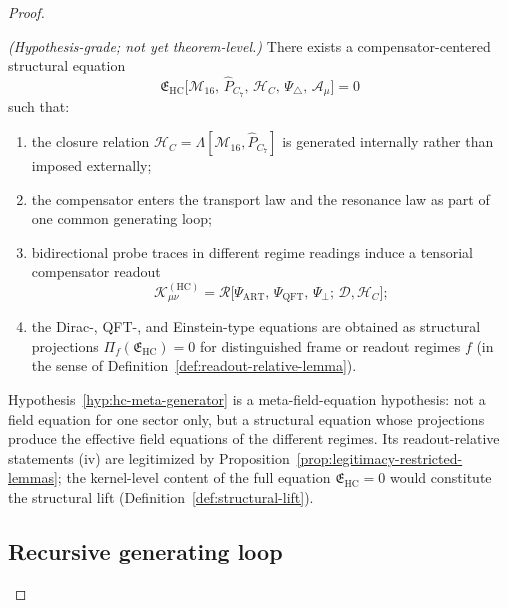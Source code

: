 \begin{proof}
\begin{proposition}
\label{hyp:hc-meta-generator}
\emph{(Hypothesis-grade; not yet theorem-level.)}
There exists a compensator-centered structural equation
\[
  \mathfrak{E}_{\mathrm{HC}}
  \bigl[
    \mathcal{M}_{16},\,
    \hat{P}_{C_7},\,
    \mathcal{H}_C,\,
    \Psi_\triangle,\,
    \mathcal{A}_\mu
  \bigr]
  = 0
\]
such that:
\begin{enumerate}[label=(\roman*)]
  \item the closure relation
        $\mathcal{H}_C = \Lambda[\mathcal{M}_{16},\hat{P}_{C_7}]$
        is generated internally rather than imposed externally;
  \item the compensator enters the transport law and the resonance law
        as part of one common generating loop;
  \item bidirectional probe traces in different regime readings induce a
        tensorial compensator readout
        \[
          \mathcal{K}_{\mu\nu}^{(\mathrm{HC})}
          =
          \mathcal{R}\bigl[
            \Psi_{\mathrm{ART}},\,
            \Psi_{\mathrm{QFT}},\,
            \Psi_\perp;\,
            \mathcal{D},\mathcal{H}_C
          \bigr];
        \]
  \item the Dirac-, QFT-, and Einstein-type equations are obtained as
        structural projections
        $\Pi_f(\mathfrak{E}_{\mathrm{HC}}) = 0$
        for distinguished frame or readout regimes $f$
        (in the sense of Definition~\ref{def:readout-relative-lemma}).
\end{enumerate}
\end{proposition}

\begin{remark}
Hypothesis~\ref{hyp:hc-meta-generator} is a meta-field-equation
hypothesis: not a field equation for one sector only, but a structural
equation whose projections produce the effective field equations of the
different regimes. Its readout-relative statements (iv) are
legitimized by Proposition~\ref{prop:legitimacy-restricted-lemmas};
the kernel-level content of the full equation $\mathfrak{E}_{\mathrm{HC}} = 0$
would constitute the structural lift
(Definition~\ref{def:structural-lift}).
\end{remark}

\subsection*{Recursive generating loop}


\end{proof}
